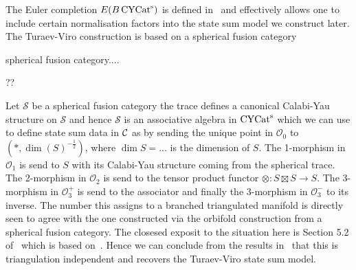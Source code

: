 The Euler completion $E(B\operatorname{\mathrm{CYCat}^s})$ is defined in~\cite{3DOrb} and effectively allows one to include certain normalisation factors into the state sum model we construct later. 
The Turaev-Viro construction is based on a spherical fusion category
\begin{definition}
    spherical fusion category....
\end{definition}
\begin{example}
    ??
\end{example}
Let $\mathcal{S}$ be a spherical fusion category the trace defines a canonical Calabi-Yau structure on $\mathcal{S}$ and hence $\mathcal{S}$ is an associative algebra in $\operatorname{\mathrm{CYCat}^s}$ which we can use to define state sum data in $\mathcal{C}$ as by sending the unique point in $\mathcal{O}_0$ to $(*,\dim (S)^{-\tfrac{1}{2}})$, where $\dim S = ...$ is the dimension of $S$. The 1-morphism in $\mathcal{O}_1$ is send to $S$ with its Calabi-Yau structure coming from the spherical trace. The 2-morphism in $\mathcal{O}_2$ is send to the tensor product functor $\otimes \colon S\boxtimes S \to S$. The 3-morphism in $\mathcal{O}_3^+$ is send to the associator and finally the 3-morphism in $\mathcal{O}_3^-$ to its inverse. The number this assigns to a branched triangulated manifold is directly seen to agree with the one constructed via the orbifold construction from a spherical fusion category. The closesed exposit to the situation here is Section 5.2 of~\cite{3DOrb} which is based on~\cite{}. Hence we can conclude from the results in~\cite{} that this is triangulation independent and recovers the Turaev-Viro state sum model. 